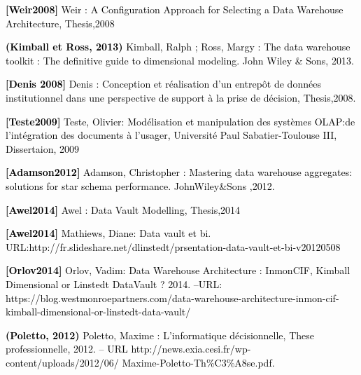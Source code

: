 \documentclass[a4paper,12pt]{report}
\begin{document}
	\item[] \textcolor{black}{
\textbf{[Weir2008]}  Weir : A Configuration Approach for Selecting a Data Warehouse Architecture, Thesis,2008}
\\

	\item[] \textcolor{black}{
\textbf{(Kimball et Ross, 2013)} Kimball, Ralph ; Ross, Margy : The data warehouse toolkit : The definitive guide to dimensional modeling. John Wiley \& Sons, 2013.	
}
\\

	\item[] \textcolor{black}{
\textbf{[Denis 2008]} Denis : Conception et réalisation d’un entrepôt de données institutionnel dans une perspective de support à la prise de décision, Thesis,2008.}
\\

	\item[] \textcolor{black}{
\textbf{[Teste2009]} Teste, Olivier: Modélisation et manipulation des systèmes OLAP:de l’intégration des documents à l’usager, Université Paul Sabatier-Toulouse III, Dissertaion, 2009}


	\item[] \textcolor{black}{
\textbf{[Adamson2012] } Adamson, Christopher : Mastering data warehouse aggregates: solutions for star schema performance. JohnWiley&Sons ,2012.}
\\

	\item[] \textcolor{black}{
\textbf{[Awel2014]}  Awel : Data Vault Modelling, Thesis,2014}
\\

	\item[] \textcolor{black}{
\textbf{[Awel2014]} Mathiews, Diane: Data vault et bi. URL:http://fr.slideshare.net/dlinstedt/prsentation-data-vault-et-bi-v20120508}
\\

	\item[] \textcolor{black}{
\textbf{[Orlov2014] } Orlov, Vadim: Data Warehouse Architecture : InmonCIF, Kimball Dimensional or Linstedt DataVault ? 2014. –URL: https://blog.westmonroepartners.com/data-warehouse-architecture-inmon-cif-kimball-dimensional-or-linstedt-data-vault/}
\\

	\item[] \textcolor{black}{
\textbf{(Poletto, 2012)} Poletto, Maxime : L’informatique décisionnelle, These professionnelle, 2012. – URL http://news.exia.cesi.fr/wp-content/uploads/2012/06/
Maxime-Poletto-Th\%C3\%A8se.pdf.}
\end{document}
